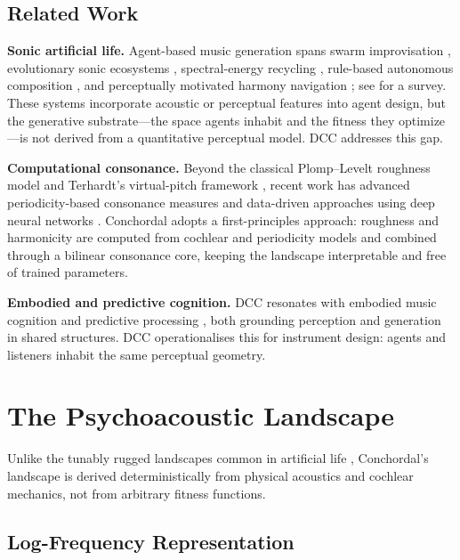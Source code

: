 \documentclass[letterpaper]{article}
\begin{document}
\subsection*{Related Work}

\textbf{Sonic artificial life.}
Agent-based music generation spans swarm improvisation \citep{blackwell2002}, evolutionary sonic ecosystems \citep{mccormack2003}, spectral-energy recycling \citep{eldridge2009}, rule-based autonomous composition \citep{eigenfeldt2013}, and perceptually motivated harmony navigation \citep{bernardes2016}; see \citet{miranda2002} for a survey. These systems incorporate acoustic or perceptual features into agent design, but the generative substrate---the space agents inhabit and the fitness they optimize---is not derived from a quantitative perceptual model. DCC addresses this gap.

\textbf{Computational consonance.}
Beyond the classical Plomp--Levelt roughness model \citep{plomp1965} and Terhardt's virtual-pitch framework \citep{terhardt1979}, recent work has advanced periodicity-based consonance measures \citep{stolzenburg2015} and data-driven approaches using deep neural networks \citep{harrison2020}. Conchordal adopts a first-principles approach: roughness and harmonicity are computed from cochlear and periodicity models and combined through a bilinear consonance core, keeping the landscape interpretable and free of trained parameters.

\textbf{Embodied and predictive cognition.}
DCC resonates with embodied music cognition \citep{leman2007} and predictive processing \citep{clark2013}, both grounding perception and generation in shared structures. DCC operationalises this for instrument design: agents and listeners inhabit the same perceptual geometry.

\section{The Psychoacoustic Landscape}

Unlike the tunably rugged landscapes common in artificial life \citep{wright1932,kauffman1993}, Conchordal's landscape is derived deterministically from physical acoustics and cochlear mechanics, not from arbitrary fitness functions.

\subsection{Log-Frequency Representation}
\end{document}
